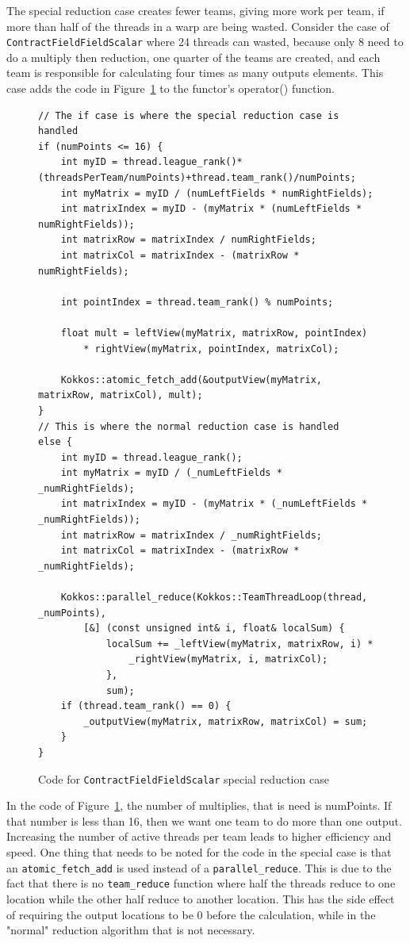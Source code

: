 The special reduction case creates fewer teams, giving more work per team, if
more than half of the threads in a warp are being wasted. Consider the
case of \texttt{ContractFieldFieldScalar} where 24 threads can wasted, because only 8
need to do a multiply then reduction, one quarter of the teams are created, and
each team is responsible for calculating four times as many outputs elements.
This case adds the code in
Figure~\ref{lst:ContractFieldFieldScalarReductionSpecialCase} to the functor's
operator() function. \\
\begin{figure}[!ht]
    \begin{lstlisting}
// The if case is where the special reduction case is handled
if (numPoints <= 16) {	
	int myID = thread.league_rank()*(threadsPerTeam/numPoints)+thread.team_rank()/numPoints;
	int myMatrix = myID / (numLeftFields * numRightFields);
	int matrixIndex = myID - (myMatrix * (numLeftFields * numRightFields));
	int matrixRow = matrixIndex / numRightFields;
	int matrixCol = matrixIndex - (matrixRow * numRightFields);

	int pointIndex = thread.team_rank() % numPoints;

	float mult = leftView(myMatrix, matrixRow, pointIndex) 
		* rightView(myMatrix, pointIndex, matrixCol);

	Kokkos::atomic_fetch_add(&outputView(myMatrix, matrixRow, matrixCol), mult);
}
// This is where the normal reduction case is handled
else {
	int myID = thread.league_rank();
	int myMatrix = myID / (_numLeftFields * _numRightFields);
	int matrixIndex = myID - (myMatrix * (_numLeftFields * _numRightFields));
	int matrixRow = matrixIndex / _numRightFields;
	int matrixCol = matrixIndex - (matrixRow * _numRightFields);

	Kokkos::parallel_reduce(Kokkos::TeamThreadLoop(thread, _numPoints),
		[&] (const unsigned int& i, float& localSum) {
			localSum += _leftView(myMatrix, matrixRow, i) *
				_rightView(myMatrix, i, matrixCol);
			},
			sum);
	if (thread.team_rank() == 0) {
		_outputView(myMatrix, matrixRow, matrixCol) = sum;
	}
}
    \end{lstlisting}
\caption{Code for \texttt{ContractFieldFieldScalar} special reduction case
\label{lst:ContractFieldFieldScalarReductionSpecialCase}} 
\end{figure}

In the code of Figure~\ref{lst:ContractFieldFieldScalarReductionSpecialCase}, the number of multiplies, that is need is numPoints. If that number is less than 16, then we want one team to do more than one output. Increasing the number of active threads per team leads to higher efficiency and speed.
One thing that needs to be noted for the code in the special case is that an
\texttt{atomic\_fetch\_add} is used instead of a \texttt{parallel\_reduce}. This is due to the fact
that there is no \texttt{team\_reduce} function where half the threads reduce to one
location while the other half reduce to another location. This has the side
effect of requiring the output locations to be 0 before the calculation, while
in the "normal" reduction algorithm that is not necessary. 

